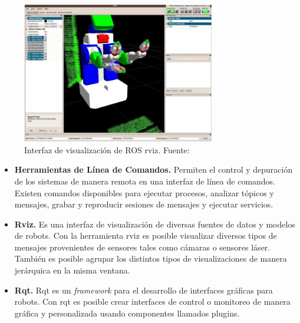         \begin{figure}[!h] 
            \centering
            \includegraphics[width=0.75\textwidth]{img/rviz}
            \caption[Interfaz de visualización de ROS rviz]{Interfaz de visualización de ROS rviz. Fuente: \cite{roswiki} }
            \label{fig:rviz}
        \end{figure}

        \begin{itemize}
            \item \textbf{Herramientas de Línea de Comandos.} Permiten el control y depuración de los sistemas 
            de manera remota en una interfaz de línea de comandos. Existen comandos disponibles para ejecutar procesos, 
            analizar tópicos y mensajes, grabar y reproducir sesiones de mensajes y ejecutar servicios.

            \item \textbf{Rviz.} Es una interfaz de visualización de diversas fuentes de datos y modelos de robots. 
            Con la herramienta rviz es posible visualizar diversos tipos de mensajes provenientes de sensores tales 
            como cámaras o sensores láser. También es posible agrupar los distintos tipos de visualizaciones de manera 
            jerárquica en la misma ventana.

            \item \textbf{Rqt.} Rqt es un \textit{framework} para el desarrollo de interfaces gráficas para robots. 
            Con rqt es posible crear interfaces de control o monitoreo de manera gráfica y personalizada usando 
            componentes llamados plugins.

        \end{itemize}



